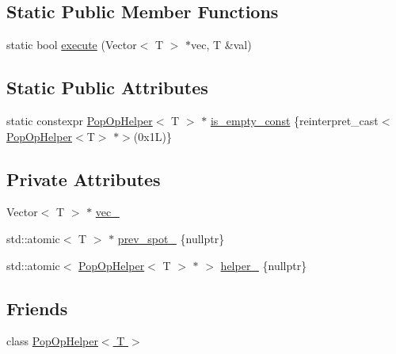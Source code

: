 \subsection*{Static Public Member Functions}
\begin{DoxyCompactItemize}
\item 
static bool \hyperlink{classtervel_1_1containers_1_1wf_1_1vector_1_1_pop_op_a54386e257528936796ac13e7ca72394a}{execute} (Vector$<$ T $>$ $\ast$vec, T \&val)
\end{DoxyCompactItemize}
\subsection*{Static Public Attributes}
\begin{DoxyCompactItemize}
\item 
static constexpr \hyperlink{classtervel_1_1containers_1_1wf_1_1vector_1_1_pop_op_helper}{Pop\+Op\+Helper}$<$ T $>$ $\ast$ \hyperlink{classtervel_1_1containers_1_1wf_1_1vector_1_1_pop_op_a2f0d5f83e90cec090ec83ae5ba5d056b}{is\+\_\+empty\+\_\+const} \{reinterpret\+\_\+cast$<$\hyperlink{classtervel_1_1containers_1_1wf_1_1vector_1_1_pop_op_helper}{Pop\+Op\+Helper}$<$T$>$ $\ast$$>$(0x1\+L)\}
\end{DoxyCompactItemize}
\subsection*{Private Attributes}
\begin{DoxyCompactItemize}
\item 
Vector$<$ T $>$ $\ast$ \hyperlink{classtervel_1_1containers_1_1wf_1_1vector_1_1_pop_op_a32b0803cfcf70ab2b86b59b6790eb676}{vec\+\_\+}
\item 
std\+::atomic$<$ T $>$ $\ast$ \hyperlink{classtervel_1_1containers_1_1wf_1_1vector_1_1_pop_op_afedc8c1eafbacd0601a72c43fd1dc521}{prev\+\_\+spot\+\_\+} \{nullptr\}
\item 
std\+::atomic$<$ \hyperlink{classtervel_1_1containers_1_1wf_1_1vector_1_1_pop_op_helper}{Pop\+Op\+Helper}$<$ T $>$ $\ast$ $>$ \hyperlink{classtervel_1_1containers_1_1wf_1_1vector_1_1_pop_op_a628660acd654de451aa0554f365a458d}{helper\+\_\+} \{nullptr\}
\end{DoxyCompactItemize}
\subsection*{Friends}
\begin{DoxyCompactItemize}
\item 
class \hyperlink{classtervel_1_1containers_1_1wf_1_1vector_1_1_pop_op_a3c1a5b124243e3f3d5eb89eb57751655}{Pop\+Op\+Helper$<$ T $>$}
\end{DoxyCompactItemize}


